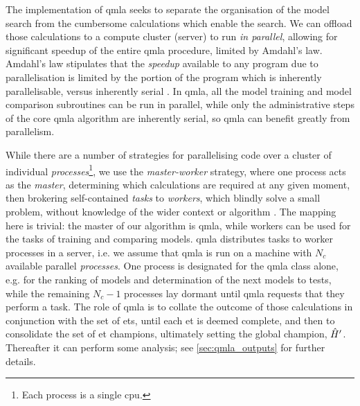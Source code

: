 The implementation of \gls{qmla} seeks to separate the organisation of the  \gls{model search}  from the 
    cumbersome calculations which enable the search. 
We can offload those calculations to a compute cluster (server) to run \emph{in parallel},
    allowing for significant speedup of the entire \gls{qmla} procedure, 
    limited by Amdahl's law. 
Amdahl's law stipulates that the \emph{speedup} available to any program due to parallelisation 
    is limited by the portion of the program which is inherently parallelisable, versus inherently serial \cite{hill2008amdahl}.
In \gls{qmla}, all the model training and model comparison subroutines can be run in parallel, 
    while only the administrative steps of the core \gls{qmla} algorithm are inherently serial, 
    so \gls{qmla} can benefit greatly from parallelism.
\par

While there are a number of strategies for parallelising code over a cluster of individual \emph{processes}\footnote{Each process is a single \acrshort{cpu}.}, 
    we use the \emph{master-worker} strategy, where one process acts as the \emph{master}, 
    determining which calculations are required at any given moment, 
    then brokering self-contained \emph{tasks} to \emph{workers}, 
    which blindly solve a small problem, without knowledge of the wider context or algorithm \cite{hockney2019parallel}.
The mapping here is trivial: the master of our algorithm is \gls{qmla}, 
    while workers can be used for the tasks of training and comparing models. 
\gls{qmla} distributes tasks to worker processes in a server, 
    i.e. we assume that \gls{qmla} is run on a machine with $N_c$ available parallel \emph{processes}\footnotemark. 
One process is designated for the \gls{qmla} class alone,
    e.g. for the ranking of models and determination of the next models to tests, 
    while the remaining $N_c - 1$ processes lay dormant until \gls{qmla} requests that they perform a task. 
The role of \gls{qmla} is to collate the outcome of those calculations in conjunction with the set of \glspl{et}, 
    until each \gls{et} is deemed complete, and then to consolidate the set of 
    \gls{et} champions, ultimately setting the global champion, $\hat{H}^{\prime}$. 
Thereafter it can perform some analysis; see \cref{sec:qmla_outputs} for further details. 

